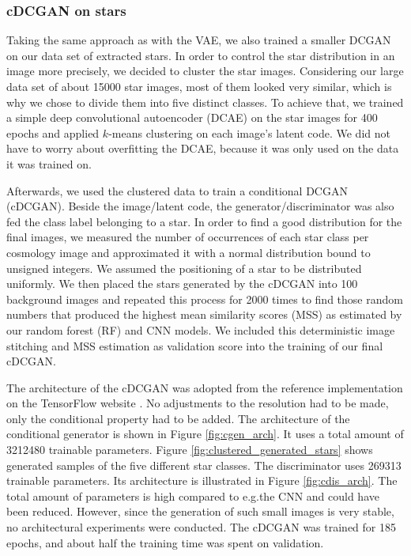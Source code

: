 \documentclass[10pt,conference,compsocconf]{IEEEtran}
\begin{document}
\subsubsection{cDCGAN on stars}
Taking the same approach as with the VAE, we also trained a smaller DCGAN on our data set of extracted stars.
In order to control the star distribution in an image more precisely, we decided to cluster the star images. Considering our large data set of about \SI{15000}{} star images, most of them looked very similar, which is why we chose to divide them into five distinct classes. To achieve that, we trained a simple deep convolutional autoencoder (DCAE) on the star images for 400 epochs and applied $k$-means clustering on each image's latent code. We did not have to worry about overfitting the DCAE, because it was only used on the data it was trained on.

Afterwards, we used the clustered data to train a conditional DCGAN (cDCGAN). Beside the image/latent code, the generator/discriminator was also fed the class label belonging to a star. In order to find a good distribution for the final images, we measured the number of occurrences of each star class per cosmology image and approximated it with a normal distribution bound to unsigned integers. We assumed the positioning of a star to be distributed uniformly. We then placed the stars generated by the cDCGAN into \SI{100}{} background images and repeated this process for \SI{2000}{} times to find those random numbers that produced the highest mean similarity scores (MSS) as estimated by our random forest (RF) and CNN models. We included this deterministic image stitching and MSS estimation as validation score into the training of our final cDCGAN.


The architecture of the cDCGAN was adopted from the reference implementation on the TensorFlow website \cite{dcgantf}. No adjustments to the resolution had to be made, only the conditional property had to be added. The architecture of the conditional generator is shown in Figure \ref{fig:cgen_arch}. It uses a total amount of \SI{3212480}{} trainable parameters. Figure \ref{fig:clustered_generated_stars} shows generated samples of the five different star classes. The discriminator uses \SI{269313}{} trainable parameters. Its architecture is illustrated in Figure \ref{fig:cdis_arch}. The total amount of parameters is high compared to e.g.\@ the CNN and could have been reduced. However, since the generation of such small images is very stable, no architectural experiments were conducted. The cDCGAN was trained for 185 epochs, and about half the training time was spent on validation.
\end{document}
